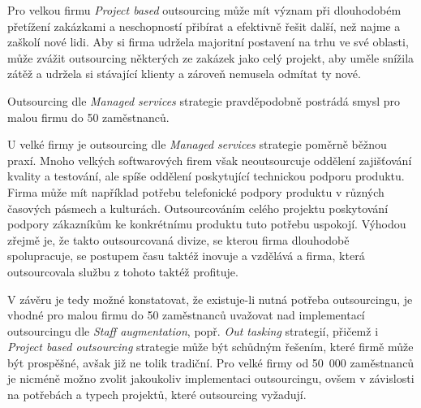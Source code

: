 \documentclass[a4paper,12pt]{article}
\begin{document}
    Pro velkou firmu \textit{Project based} outsourcing může mít význam při dlouhodobém přetížení zakázkami a neschopností přibírat a efektivně řešit další, než najme a zaškolí nové lidi. Aby si firma udržela majoritní postavení na trhu ve své oblasti, může zvážit outsourcing některých ze zakázek jako celý projekt, aby uměle snížila zátěž a udržela si stávající klienty a zároveň nemusela odmítat ty nové.

    Outsourcing dle \textit{Managed services} strategie pravděpodobně postrádá smysl pro malou firmu do 50 zaměstnanců.

    U velké firmy je outsourcing dle \textit{Managed services} strategie poměrně běžnou praxí. Mnoho velkých softwarových firem však neoutsourcuje oddělení zajišťování kvality a testování, ale spíše oddělení poskytující technickou podporu produktu. Firma může mít například potřebu telefonické podpory produktu v různých časových pásmech a kulturách. Outsourcováním celého projektu poskytování podpory zákazníkům ke konkrétnímu produktu tuto potřebu uspokojí. Výhodou zřejmě je, že takto outsourcovaná divize, se kterou firma dlouhodobě spolupracuje, se postupem času taktéž inovuje a vzdělává a firma, která outsourcovala službu z tohoto taktéž profituje.

    V závěru je tedy možné konstatovat, že existuje-li nutná potřeba outsourcingu, je vhodné pro malou firmu do 50 zaměstnanců uvažovat nad implementací outsourcingu dle \textit{Staff augmentation}, popř. \textit{Out tasking} strategií, přičemž i \textit{Project based outsourcing} strategie může být schůdným řešením, které firmě může být prospěšné, avšak již ne tolik tradiční. Pro velké firmy od 50~000 zaměstnanců je nicméně možno zvolit jakoukoliv implementaci outsourcingu, ovšem v závislosti na potřebách a typech projektů, které outsourcing vyžadují.
\end{document}
